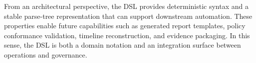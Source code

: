 From an architectural perspective, the DSL provides deterministic syntax and a stable parse-tree representation that can support downstream automation. These properties enable future capabilities such as generated report templates, policy conformance validation, timeline reconstruction, and evidence packaging. In this sense, the DSL is both a domain notation and an integration surface between operations and governance.
